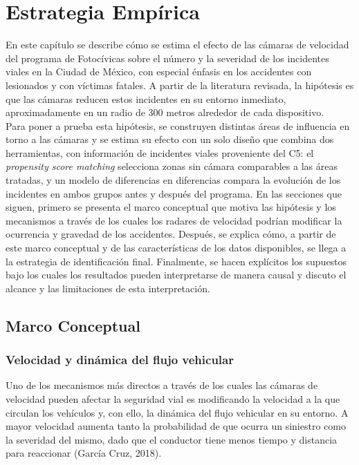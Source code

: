 \chapter{Estrategia Empírica}

\noindent En este capítulo se describe cómo se estima el efecto de las cámaras de velocidad del programa de Fotocívicas sobre el número y la severidad de los incidentes viales en la Ciudad de México, con especial énfasis en los accidentes con lesionados y con víctimas fatales. A partir de la literatura revisada, la hipótesis es que las cámaras reducen estos incidentes en su entorno inmediato, aproximadamente en un radio de 300 metros alrededor de cada dispositivo.\\

Para poner a prueba esta hipótesis, se construyen distintas áreas de influencia en torno a las cámaras y se estima su efecto con un solo diseño que combina dos herramientas, con información de incidentes viales proveniente del C5: el \textit{propensity score matching} selecciona zonas sin cámara comparables a las áreas tratadas, y un modelo de diferencias en diferencias compara la evolución de los incidentes en ambos grupos antes y después del programa. En las secciones que siguen, primero se presenta el marco conceptual que motiva las hipótesis y los mecanismos a través de los cuales los radares de velocidad podrían modificar la ocurrencia y gravedad de los accidentes. Después, se explica cómo, a partir de este marco conceptual y de las características de los datos disponibles, se llega a la estrategia de identificación final. Finalmente, se hacen explícitos los supuestos bajo los cuales los resultados pueden interpretarse de manera causal y discuto el alcance y las limitaciones de esta interpretación.\\

\section{Marco Conceptual}
\subsection{Velocidad y dinámica del flujo vehicular}
\noindent Uno de los mecanismos más directos a través de los cuales las cámaras de velocidad pueden afectar la seguridad vial es modificando la velocidad a la que circulan los vehículos y, con ello, la dinámica del flujo vehicular en su entorno. A mayor velocidad aumenta tanto la probabilidad de que ocurra un siniestro como la severidad del mismo, dado que el conductor tiene menos tiempo y distancia para reaccionar (García Cruz, 2018).\\

